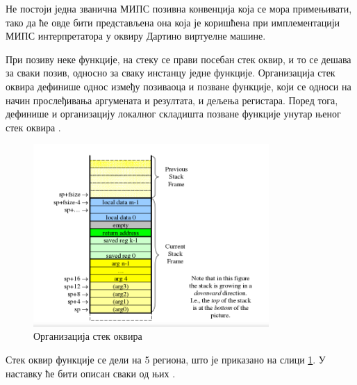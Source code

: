 \documentclass[12pt,oneside]{memoir}
\begin{document}
Не постоји једна званична МИПС позивна конвенција која се мора примењивати, тако да ће овде бити представљена она која је коришћена при имплементацији МИПС интерпретатора у оквиру Дартино виртуелне машине.

При позиву неке функције, на стеку се прави посебан стек оквир, и то се дешава за сваки позив, односно за сваку инстанцу једне функције. Организација стек оквира дефинише однос између позиваоца и позване функције, који се односи на начин прослеђивања аргумената и резултата, и дељења регистара. Поред тога, дефинише и организацију локалног складишта позване функције унутар њеног стек оквира \cite{konvencija}.

\begin{figure}[!ht]
  \centering
  \includegraphics[width=0.8\textwidth]{stack_frame.png}
  \caption{Организација стек оквира}
  \label{fig:stack_frame}
\end{figure}

Стек оквир функције се дели на 5 региона, што је приказано на слици \ref{fig:stack_frame}. У наставку ће бити описан сваки од њих \cite{konvencija}.
\end{document}
